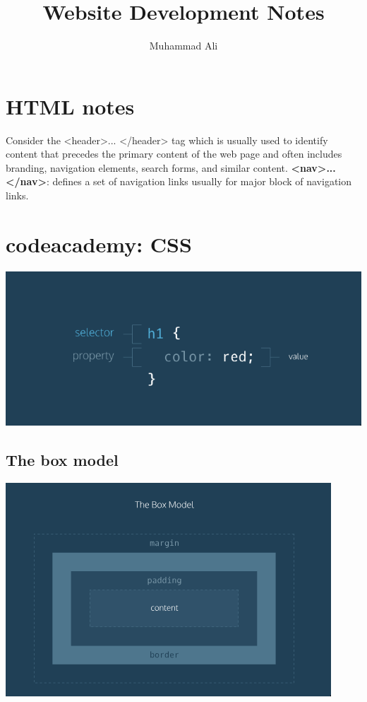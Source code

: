 \documentclass{article}
\def\html#1{{\textless#1\textgreater ... \textless/#1\textgreater}}
\begin{document}
\title{Website Development Notes}
\author{Muhammad Ali}
\date{}
\maketitle

\section{HTML notes}
Consider the \html{header} tag which is usually used to identify content that precedes the primary content of the web page and often includes branding, navigation elements, search forms, and similar content.\newline \newline
\textbf{\html{nav}}: defines a set of navigation links usually for major block of navigation links.


\section{codeacademy: CSS}
\includegraphics[scale=0.25]{css-outline.png}
\subsection{The box model}
\includegraphics[scale=0.5]{box-model.png}
\end{document}

